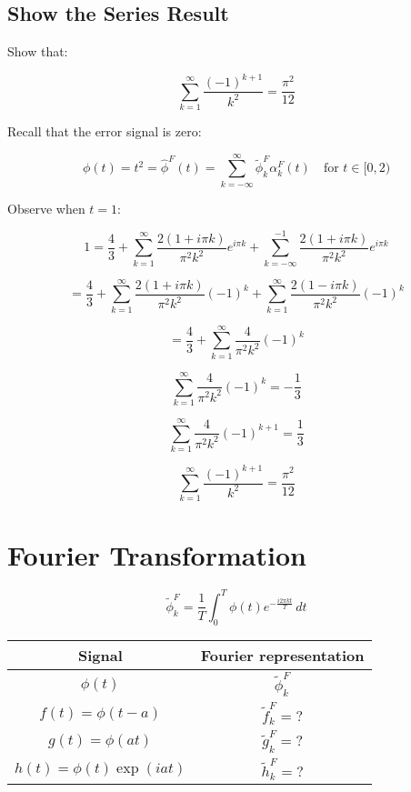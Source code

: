 \documentclass[12pt]{article}
\begin{document}
\newpage

\subsection{Show the Series Result}

Show that:

\[
\sum_{k=1}^{\infty} \frac{(-1)^{k+1}}{k^2} = \frac{\pi^2}{12}
\]

Recall that the error signal is zero:

\[
\phi(t) = t^2 = \hat{\phi}^F(t) = \sum_{k=-\infty}^{\infty} \tilde{\phi}_k^F \alpha_k^F(t) \quad \text{for } t \in [0,2)
\]

Observe when \( t = 1 \):

\[
1 = \frac{4}{3} + \sum_{k=1}^{\infty} \frac{2(1 + i\pi k)}{\pi^2 k^2} e^{i\pi k} + \sum_{k=-\infty}^{-1} \frac{2(1 + i\pi k)}{\pi^2 k^2} e^{i\pi k}
\]

\[
= \frac{4}{3} + \sum_{k=1}^{\infty} \frac{2(1 + i\pi k)}{\pi^2 k^2} (-1)^k + \sum_{k=1}^{\infty} \frac{2(1 - i\pi k)}{\pi^2 k^2} (-1)^k
\]

\[
= \frac{4}{3} + \sum_{k=1}^{\infty} \frac{4}{\pi^2 k^2} (-1)^k
\]

\[
\sum_{k=1}^{\infty} \frac{4}{\pi^2 k^2} (-1)^k = -\frac{1}{3}
\]

\[
\sum_{k=1}^{\infty} \frac{4}{\pi^2 k^2} (-1)^{k+1} = \frac{1}{3}
\]

\[
\sum_{k=1}^{\infty} \frac{(-1)^{k+1}}{k^2} = \frac{\pi^2}{12}
\]

\newpage

\section{Fourier Transformation}

\[
\tilde{\phi}_k^F = \frac{1}{T} \int_0^T \phi(t) e^{-\frac{i2\pi kt}{T}} \, dt
\]

\begin{tabular}{|c|c|}
\hline
Signal & Fourier representation \\
\hline
\(\phi(t)\) & \(\tilde{\phi}_k^F\) \\
\hline
\(f(t) = \phi(t-a)\) & \(\tilde{f}_k^F = ?\) \\
\hline
\(g(t) = \phi(at)\) & \(\tilde{g}_k^F = ?\) \\
\hline
\(h(t) = \phi(t)\exp(iat)\) & \(\tilde{h}_k^F = ?\) \\
\hline
\end{tabular}
\end{document}
